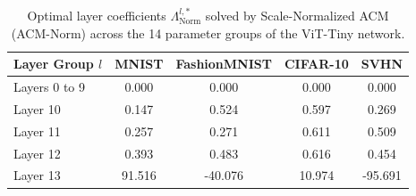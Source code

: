 \begin{table}[ht]
\caption{Optimal layer coefficients $\Lambda^{l, *}_{\text{Norm}}$ solved by Scale-Normalized ACM (ACM-Norm) across the 14 parameter groups of the ViT-Tiny network.}
\label{tab:coefficients}
\vskip 0.15in
\begin{center}
\begin{small}
\begin{sc}
\begin{tabular}{lcccc}
\toprule
Layer Group $l$ & MNIST & FashionMNIST & CIFAR-10 & SVHN \\
\midrule
Layers 0 to 9 & 0.000 & 0.000 & 0.000 & 0.000 \\
Layer 10 & 0.147 & 0.524 & 0.597 & 0.269 \\
Layer 11 & 0.257 & 0.271 & 0.611 & 0.509 \\
Layer 12 & 0.393 & 0.483 & 0.616 & 0.454 \\
Layer 13 & 91.516 & -40.076 & 10.974 & -95.691 \\
\bottomrule
\end{tabular}
\end{sc}
\end{small}
\end{center}
\vskip -0.1in
\end{table}


